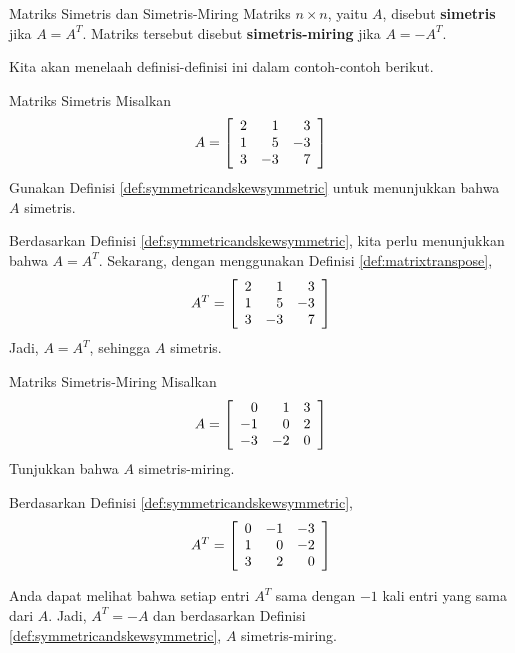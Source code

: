 \begin{definition}{Matriks Simetris dan Simetris-Miring}\label{def:symmetricandskewsymmetric}
Matriks $n\times n$, yaitu $A$, disebut
\textbf{simetris} jika $A=A^{T}.$ Matriks tersebut disebut
 \textbf{simetris-miring} jika $A=-A^{T}.$
\end{definition}

Kita akan menelaah definisi-definisi ini dalam contoh-contoh berikut.

\begin{example}{Matriks Simetris}\label{exa:symmetricmatrix}
Misalkan
\begin{equation*}
A=\left[
\begin{array}{rrr}
2 & 1 & 3 \\
1 & 5 & -3 \\
3 & -3 & 7
\end{array}
\right] 
\end{equation*}
Gunakan Definisi \ref{def:symmetricandskewsymmetric} untuk menunjukkan bahwa $A$ simetris. 
\end{example}

\begin{solution}
Berdasarkan Definisi \ref{def:symmetricandskewsymmetric}, kita perlu menunjukkan bahwa $A = A^T$.
Sekarang, dengan menggunakan Definisi \ref{def:matrixtranspose},
\begin{equation*}
A^{T} = \left[
\begin{array}{rrr}
2 & 1 & 3 \\
1 & 5 & -3 \\
3 & -3 & 7
\end{array}
\right]
\end{equation*}
Jadi, $A = A^{T}$, sehingga $A$ simetris.
\end{solution}

\begin{example}{Matriks Simetris-Miring}\label{exa:skewsymmetricmatrix}
Misalkan
\begin{equation*}
A=\left[
\begin{array}{rrr}
0 & 1 & 3 \\
-1 & 0 & 2 \\
-3 & -2 & 0
\end{array}
\right] 
\end{equation*}
Tunjukkan bahwa $A$ simetris-miring.
\end{example}

\begin{solution} Berdasarkan Definisi \ref{def:symmetricandskewsymmetric},
\begin{equation*}
A^{T} = \left[
\begin{array}{rrr}
0 & -1 & -3\\
1 &  0 & -2\\
3 &  2 &  0
\end{array}
\right] 
\end{equation*}

Anda dapat melihat bahwa setiap entri $A^T$ sama dengan $-1$ kali entri yang sama dari $A$.
Jadi, $A^{T} = - A$ dan berdasarkan Definisi \ref{def:symmetricandskewsymmetric}, $A$ simetris-miring.
\end{solution}
